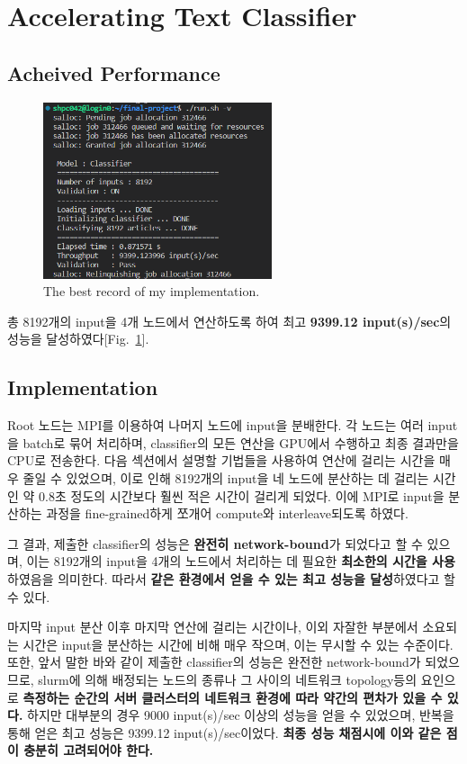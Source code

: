 \section{Accelerating Text Classifier}

\subsection{Acheived Performance}

\begin{figure}[h]
    \centering
    \includegraphics[width=0.6\textwidth]{imgs/best_record.png}
    \caption{The best record of my implementation.}
    \label{fig:best_record}
\end{figure}

총 8192개의 input을 4개 노드에서 연산하도록 하여 최고 
\textbf{9399.12 input(s)/sec}의 성능을 달성하였다[Fig.~\ref{fig:best_record}].

\subsection{Implementation}
Root 노드는 MPI를 이용하여 나머지 노드에 input을 분배한다.
각 노드는 여러 input을 batch로 묶어 처리하며,
classifier의 모든 연산을 GPU에서 수행하고 최종 결과만을 CPU로 전송한다.
다음 섹션에서 설명할 기법들을 사용하여 연산에 걸리는 시간을 매우 줄일 수 있었으며,
이로 인해 8192개의 input을 네 노드에 분산하는 데 걸리는 시간인
약 0.8초 정도의 시간보다 훨씬 적은 시간이 걸리게 되었다.
이에 MPI로 input을 분산하는 과정을 fine-grained하게 쪼개어 compute와 interleave되도록 하였다.

그 결과, 제출한 classifier의 성능은 \textbf{완전히 network-bound}가 되었다고 할 수 있으며,
이는 8192개의 input을 4개의 노드에서 처리하는 데 필요한 \textbf{최소한의 시간을 사용}하였음을 의미한다.
따라서 \textbf{같은 환경에서 얻을 수 있는 최고 성능을 달성}하였다고 할 수 있다.

마지막 input 분산 이후 마지막 연산에 걸리는 시간이나, 이외 자잘한 부분에서 소요되는 시간은
input을 분산하는 시간에 비해 매우 작으며, 이는 무시할 수 있는 수준이다.
또한, 앞서 말한 바와 같이 제출한 classifier의 성능은 완전한 network-bound가 되었으므로,
slurm에 의해 배정되는 노드의 종류나 그 사이의 네트워크 topology등의 요인으로
\textbf{측정하는 순간의 서버 클러스터의 네트워크 환경에 따라 약간의 편차가 있을 수 있다.}
하지만 대부분의 경우 9000 input(s)/sec 이상의 성능을 얻을 수 있었으며,
반복을 통해 얻은 최고 성능은 9399.12 input(s)/sec이었다.
\textbf{최종 성능 채점시에 이와 같은 점이 충분히 고려되어야 한다.}

